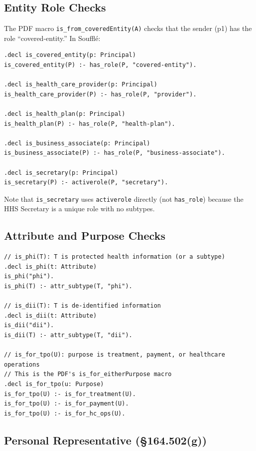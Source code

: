 \documentclass[11pt,letterpaper]{article}
\begin{document}
\subsection{Entity Role Checks}

The PDF macro \texttt{is\_from\_coveredEntity(A)} checks that the sender (p1) has the role ``covered-entity.'' In Souffl\'{e}:

\begin{lstlisting}[style=soufflestyle,caption={Entity role check predicates}]
.decl is_covered_entity(p: Principal)
is_covered_entity(P) :- has_role(P, "covered-entity").

.decl is_health_care_provider(p: Principal)
is_health_care_provider(P) :- has_role(P, "provider").

.decl is_health_plan(p: Principal)
is_health_plan(P) :- has_role(P, "health-plan").

.decl is_business_associate(p: Principal)
is_business_associate(P) :- has_role(P, "business-associate").

.decl is_secretary(p: Principal)
is_secretary(P) :- activerole(P, "secretary").
\end{lstlisting}

Note that \texttt{is\_secretary} uses \texttt{activerole} directly (not \texttt{has\_role}) because the HHS Secretary is a unique role with no subtypes.

\subsection{Attribute and Purpose Checks}

\begin{lstlisting}[style=soufflestyle,caption={Attribute and purpose check predicates}]
// is_phi(T): T is protected health information (or a subtype)
.decl is_phi(t: Attribute)
is_phi("phi").
is_phi(T) :- attr_subtype(T, "phi").

// is_dii(T): T is de-identified information
.decl is_dii(t: Attribute)
is_dii("dii").
is_dii(T) :- attr_subtype(T, "dii").

// is_for_tpo(U): purpose is treatment, payment, or healthcare operations
// This is the PDF's is_for_eitherPurpose macro
.decl is_for_tpo(u: Purpose)
is_for_tpo(U) :- is_for_treatment(U).
is_for_tpo(U) :- is_for_payment(U).
is_for_tpo(U) :- is_for_hc_ops(U).
\end{lstlisting}

\subsection{Personal Representative (\S 164.502(g))}
\label{sec:personal-rep}
\end{document}
